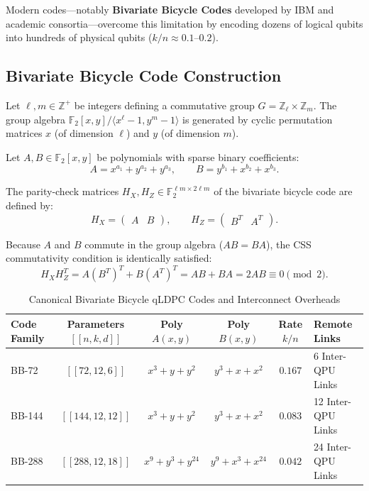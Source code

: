 Modern  codes---notably \textbf{Bivariate Bicycle Codes} developed by IBM and academic consortia---overcome this limitation by encoding dozens of logical qubits into hundreds of physical qubits ($k/n \approx 0.1\text{--}0.2$).

\subsection{Bivariate Bicycle Code Construction}
Let $\ell, m \in \mathbb{Z}^+$ be integers defining a commutative group $G = \mathbb{Z}_\ell \times \mathbb{Z}_m$. The group algebra $\mathbb{F}_2[x, y] / \langle x^\ell - 1, y^m - 1 \rangle$ is generated by cyclic permutation matrices $x$ (of dimension $\ell$) and $y$ (of dimension $m$).

Let $A, B \in \mathbb{F}_2[x, y]$ be polynomials with sparse binary coefficients:
\begin{equation}
    A = x^{a_1} + y^{a_2} + y^{a_3}, \qquad B = y^{b_1} + x^{b_2} + x^{b_3}.
\end{equation}

The parity-check matrices $H_X, H_Z \in \mathbb{F}_2^{\ell m \times 2\ell m}$ of the bivariate bicycle code are defined by:
\begin{equation}
    H_X = \begin{pmatrix} A & B \end{pmatrix}, \qquad H_Z = \begin{pmatrix} B^T & A^T \end{pmatrix}.
    \label{eq:bivariate_bicycle_hz_hx}
\end{equation}

Because $A$ and $B$ commute in the group algebra ($A B = B A$), the CSS commutativity condition is identically satisfied:
\begin{equation}
    H_X H_Z^T = A (B^T)^T + B (A^T)^T = A B + B A = 2 A B \equiv 0 \pmod 2.
\end{equation}

\begin{table}[htbp]
\centering
\small
\caption{Canonical Bivariate Bicycle qLDPC Codes and Interconnect Overheads}
\label{tab:bivariate_bicycle_specs}
\begin{tabularx}{\textwidth}{p{2.4cm} c c c c X}
\toprule
\textbf{Code Family} & \textbf{Parameters $[[n, k, d]]$} & \textbf{Poly $A(x,y)$} & \textbf{Poly $B(x,y)$} & \textbf{Rate $k/n$} & \textbf{Remote Links} \\
\midrule
BB-72 & $[[72, 12, 6]]$ & $x^3 + y + y^2$ & $y^3 + x + x^2$ & $0.167$ & 6 Inter-QPU Links \\
BB-144 & $[[144, 12, 12]]$ & $x^3 + y + y^2$ & $y^3 + x + x^2$ & $0.083$ & 12 Inter-QPU Links \\
BB-288 & $[[288, 12, 18]]$ & $x^9 + y^3 + y^{24}$ & $y^9 + x^3 + x^{24}$ & $0.042$ & 24 Inter-QPU Links \\
\bottomrule
\end{tabularx}
\end{table}


